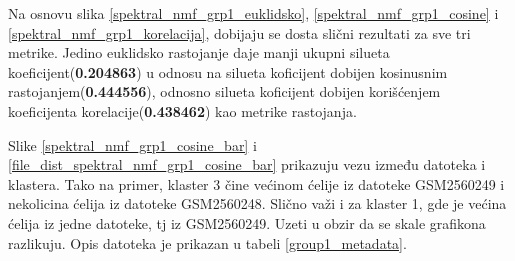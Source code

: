 \documentclass[a4paper]{article}
\begin{document}
Na osnovu slika \ref{spektral_nmf_grp1_euklidsko}, \ref{spektral_nmf_grp1_cosine} i \ref{spektral_nmf_grp1_korelacija}, dobijaju se dosta slični rezultati za sve tri metrike. Jedino euklidsko rastojanje daje manji ukupni silueta koeficijent(\textbf{0.204863}) u odnosu na silueta koficijent dobijen kosinusnim rastojanjem(\textbf{0.444556}), odnosno silueta koficijent dobijen korišćenjem koeficijenta korelacije(\textbf{0.438462}) kao metrike rastojanja.

Slike \ref{spektral_nmf_grp1_cosine_bar} i \ref{file_dist_spektral_nmf_grp1_cosine_bar} prikazuju vezu između datoteka i klastera. Tako na primer, klaster 3 čine većinom ćelije iz datoteke GSM2560249 i nekolicina ćelija iz datoteke GSM2560248. Slično važi i za klaster 1, gde je većina ćelija iz jedne datoteke, tj iz GSM2560249. Uzeti u obzir da se skale grafikona razlikuju. Opis datoteka je prikazan u tabeli \ref{group1_metadata}. 
\end{document}

